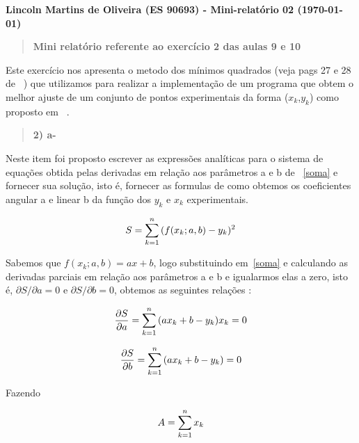 \documentclass[a4wide]{report}
\begin{document}
\noindent
{\bf Lincoln Martins de Oliveira (ES 90693) - Mini-relatório 02 (\today)}

\begin{quote}

\centering

\bf Mini relatório referente ao exercício 2 das aulas 9 e 10

\end{quote}
\vspace{0.5cm}


      Este exercício nos apresenta o metodo dos mínimos quadrados (veja pags 27 e 28 de ~\cite{Metodos}) que utilizamos para realizar
a implementação de um programa que obtem o melhor ajuste de um conjunto de pontos experimentais da forma ($x_{k}$,$y_{k}$) como proposto em ~\cite{roteiro}. 



\begin{quote}

\bf 2) a-

\end{quote}

Neste item foi proposto escrever as expressões analíticas para o sistema de equações obtida pelas derivadas em 
relação aos parâmetros a e b de ~\ref{soma} e fornecer sua solução, isto é, fornecer as formulas de como obtemos os coeficientes 
angular a e linear b da função dos $y_{k}$ e $x_{k}$ experimentais.

\begin{equation}
\centering
S  =   \sum_{k=1}^{n}{(f(x_{k};a,b)- y_{k})^2}
\label{soma}
\end{equation}

Sabemos que $f(x_{k};a,b) = ax + b $, logo substituindo em~\ref{soma} e calculando as derivadas parciais em relação aos parâmetros a e b e igualarmos elas a zero, isto é, 
$\partial S/\partial a = 0$ e $\partial S/\partial b = 0 $,  obtemos as seguintes relações :

\begin{equation}
\centering
\frac{\partial S}{\partial a} = \sum_{k=1}^{n}{(ax_{k} + b - y_{k})x_{k} = 0}
\label{deltaa}
\end{equation}

\begin{equation}
\centering
\frac{\partial S}{\partial b} = \sum_{k=1}^{n}{(ax_{k} + b - y_{k}) = 0}
\label{deltab}
\end{equation}

Fazendo

\begin{equation} 
\centering
A = \sum_{k=1}^{n}{x_{k}}
\label{A}
\end{equation}
\end{document}
